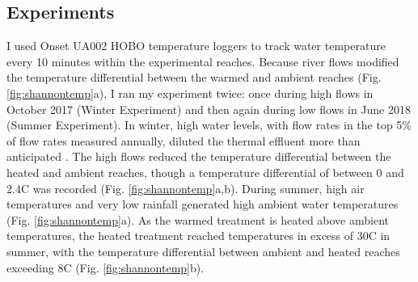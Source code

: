 \subsection{Experiments}

I used Onset UA002 HOBO temperature loggers to track water temperature every 10 minutes within the experimental reaches. Because river flows modified the temperature differential between the warmed and ambient reaches (Fig. \ref{fig:shannontemp}a), I ran my experiment twice: once during high flows in October 2017 (Winter Experiment) and then again during low flows in June 2018 (Summer Experiment). In winter, high water levels, with flow rates in the top 5\% of flow rates measured annually, diluted the thermal effluent more than anticipated \citep{opw2018}. The high flows reduced the temperature differential between the heated and ambient reaches, though a temperature differential of between 0 and 2.4\degree C was recorded (Fig. \ref{fig:shannontemp}a,b). During summer, high air temperatures and very low rainfall generated high ambient water temperatures (Fig. \ref{fig:shannontemp}a). As the warmed treatment is heated above ambient temperatures, the heated treatment reached temperatures in excess of 30\degree C in summer, with the temperature differential between ambient and heated reaches exceeding 8\degree C (Fig. \ref{fig:shannontemp}b). 

